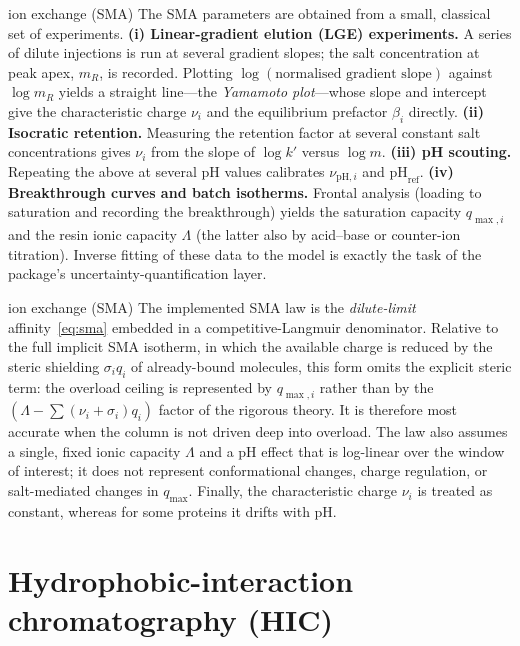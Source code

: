 \begin{databox}{ion exchange (SMA)}
The SMA parameters are obtained from a small, classical set of experiments.
\textbf{(i) Linear-gradient elution (LGE) experiments.} A series of dilute
injections is run at several gradient slopes; the salt concentration at peak
apex, $m_R$, is recorded. Plotting $\log(\text{normalised gradient slope})$
against $\log m_R$ yields a straight line---the \emph{Yamamoto plot}---whose
slope and intercept give the characteristic charge $\nu_i$ and the equilibrium
prefactor $\beta_i$ directly. \textbf{(ii) Isocratic retention.} Measuring the
retention factor at several constant salt concentrations gives $\nu_i$ from the
slope of $\log k'$ versus $\log m$. \textbf{(iii) pH scouting.} Repeating the
above at several pH values calibrates $\nu_{\mathrm{pH},i}$ and
$\mathrm{pH}_{\mathrm{ref}}$. \textbf{(iv) Breakthrough curves and batch
isotherms.} Frontal analysis (loading to saturation and recording the
breakthrough) yields the saturation capacity $q_{\max,i}$ and the resin ionic
capacity $\Lambda$ (the latter also by acid--base or counter-ion titration).
Inverse fitting of these data to the model is exactly the task of the package's
uncertainty-quantification layer.
\end{databox}

\begin{limitbox}{ion exchange (SMA)}
The implemented SMA law is the \emph{dilute-limit} affinity~\eqref{eq:sma}
embedded in a competitive-Langmuir denominator. Relative to the full implicit
SMA isotherm, in which the available charge is reduced by the steric shielding
$\sigma_i q_i$ of already-bound molecules, this form omits the explicit steric
term: the overload ceiling is represented by $q_{\max,i}$ rather than by the
$(\Lambda - \sum(\nu_i+\sigma_i)q_i)$ factor of the rigorous theory. It is
therefore most accurate when the column is not driven deep into overload. The law
also assumes a single, fixed ionic capacity $\Lambda$ and a pH effect that is
log-linear over the window of interest; it does not represent conformational
changes, charge regulation, or salt-mediated changes in $q_{\max}$. Finally, the
characteristic charge $\nu_i$ is treated as constant, whereas for some proteins
it drifts with pH.
\end{limitbox}

\section{Hydrophobic-interaction chromatography (HIC)}
\label{sec:hic}

